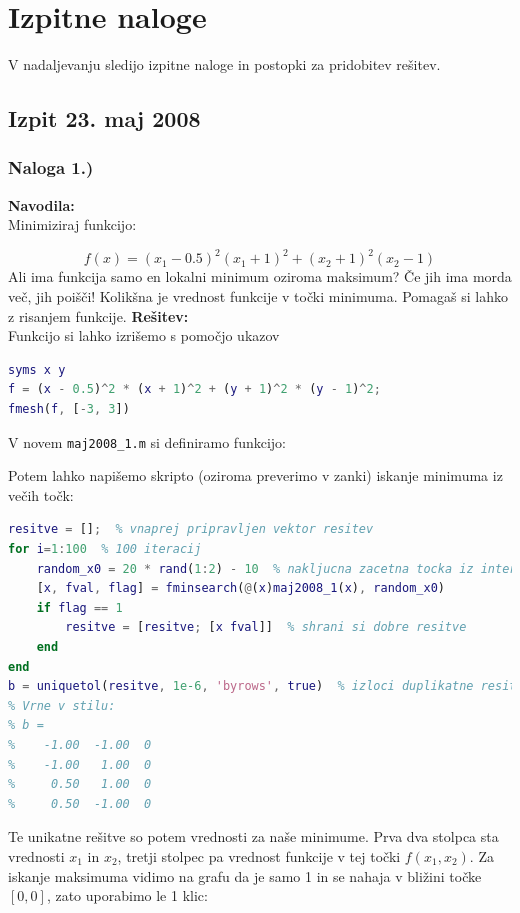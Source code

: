 \documentclass[a4paper,11pt]{article}
\begin{document}
\section{Izpitne naloge}

V nadaljevanju sledijo izpitne naloge in postopki za pridobitev rešitev.
\newpage

\subsection{Izpit 23. maj 2008}

\subsubsection{Naloga 1.)}
\label{task:maj2008_1}

\textbf{Navodila:} \\ 
Minimiziraj funkcijo:

\begin{equation} \label{eq:maj2008_1}
f(x) = (x_1 - 0.5)^2 (x_1 + 1)^2 + (x_2 + 1)^2 (x_2 - 1)
\end{equation}
Ali ima funkcija samo en lokalni minimum oziroma maksimum? Če jih ima morda več, jih poišči! Kolikšna je vrednost funkcije v točki minimuma. Pomagaš si lahko z risanjem funkcije.
\textbf{Rešitev:} \\ 
Funkcijo si lahko izrišemo s pomočjo ukazov

\begin{lstlisting}[language=Matlab]
syms x y
f = (x - 0.5)^2 * (x + 1)^2 + (y + 1)^2 * (y - 1)^2;
fmesh(f, [-3, 3])
\end{lstlisting}
V novem \texttt{maj2008\_1.m} si definiramo funkcijo:

Potem lahko napišemo skripto (oziroma preverimo v zanki) iskanje minimuma iz večih točk:

\begin{lstlisting}[language=Matlab]
resitve = [];  % vnaprej pripravljen vektor resitev
for i=1:100  % 100 iteracij
	random_x0 = 20 * rand(1:2) - 10  % nakljucna zacetna tocka iz intervala [-10, 10]
	[x, fval, flag] = fminsearch(@(x)maj2008_1(x), random_x0)
	if flag == 1
		resitve = [resitve; [x fval]]  % shrani si dobre resitve
	end
end
b = uniquetol(resitve, 1e-6, 'byrows', true)  % izloci duplikatne resitve
% Vrne v stilu:
% b = 
%    -1.00  -1.00  0
%    -1.00   1.00  0
%     0.50   1.00  0
%     0.50  -1.00  0
\end{lstlisting}
Te unikatne rešitve so potem vrednosti za naše minimume. Prva dva stolpca sta vrednosti $x_1$ in $x_2$, tretji stolpec pa vrednost funkcije v tej točki $f(x_1, x_2)$.
Za iskanje maksimuma vidimo na grafu da je samo 1 in se nahaja v bližini točke $[0, 0]$, zato uporabimo le 1 klic:
\end{document}
